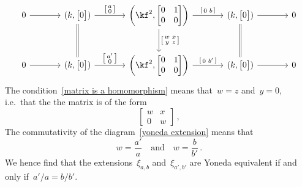 \documentclass[a4paper,11pt]{scrartcl}
\begin{document}
\begin{equation}
  \label{yoneda extension}
  \begin{tikzcd}[ampersand replacement = \&, sep = large]
    0
    \arrow{r}
    \&
    (k, \begin{bmatrix} 0 \end{bmatrix})
    \arrow{r}[above]{ \begin{bsmallmatrix} a \\ 0 \end{bsmallmatrix} }
    \arrow[equal]{d}
    \&
    \biggl( \kf^2, \begin{bmatrix} 0 & 1 \\ 0 & 0 \end{bmatrix} \biggr)
    \arrow{r}[above]{ \begin{bsmallmatrix} 0 & b \end{bsmallmatrix} }
    \arrow{d}[right]{ \begin{bsmallmatrix} w & x \\ y & z \end{bsmallmatrix} }
    \&
    (k, \begin{bmatrix} 0 \end{bmatrix})
    \arrow{r}
    \arrow[equal]{d}
    \&
    0
    \\
    0
    \arrow{r}
    \&
    (k, \begin{bmatrix} 0 \end{bmatrix})
    \arrow{r}[above]{ \begin{bsmallmatrix} a' \\ 0 \end{bsmallmatrix} }
    \&
    \biggl( \kf^2, \begin{bmatrix} 0 & 1 \\ 0 & 0 \end{bmatrix} \biggr)
    \arrow{r}[above]{ \begin{bsmallmatrix} 0 & b' \end{bsmallmatrix} }
    \&
    (k, \begin{bmatrix} 0 \end{bmatrix})
    \arrow{r}
    \&
    0
  \end{tikzcd}
\end{equation}
The condition~\eqref{matrix is a homomorphism} means that~$w = z$ and~$y = 0$, i.e.\ that the the matrix is of the form
\[
  \begin{bmatrix}
    w & x \\
    0 & w
  \end{bmatrix} \,,
\]
The commutativity of the diagram~\eqref{yoneda extension} means that
\[
  w = \frac{a'}{a}
  \quad\text{and}\quad
  w = \frac{b}{b'} \,.
\]
We hence find that the extensions~$\xi_{a,b}$ and~$\xi_{a',b'}$ are Yoneda equivalent if and only if~$a'/a = b/b'$.
\end{document}
